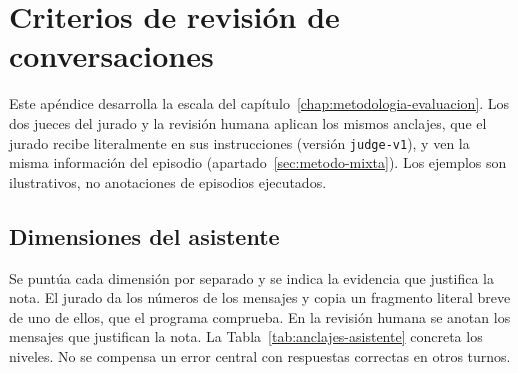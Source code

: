 \chapter{Criterios de revisión de conversaciones}
\label{app:instrumentos-revision}

Este apéndice desarrolla la escala del capítulo~\ref{chap:metodologia-evaluacion}.
Los dos jueces del jurado y la revisión humana aplican los mismos anclajes, que el
jurado recibe literalmente en sus instrucciones (versión \texttt{judge-v1}), y
ven la misma información del episodio (apartado~\ref{sec:metodo-mixta}).
Los ejemplos son ilustrativos, no anotaciones de episodios ejecutados.

\section{Dimensiones del asistente}

Se puntúa cada dimensión por separado y se indica la evidencia que justifica la
nota. El jurado da los números de los mensajes y copia un fragmento literal
breve de uno de ellos, que el programa comprueba. En la revisión humana se
anotan los mensajes que justifican la nota. La Tabla~\ref{tab:anclajes-asistente} concreta los
niveles. No se compensa un error central con respuestas correctas en otros
turnos.

